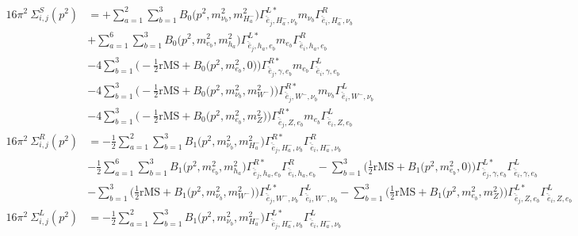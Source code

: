 \begin{itemize}
\begin{align} 
16\pi^2 \ \Sigma^S_{i,j}(p^2) &= +\sum_{a=1}^{2}\sum_{b=1}^{3}{B_0\Big(p^{2},m^2_{\nu_{{b}}},m^2_{H^-_{{a}}}\Big)} {\Gamma^{L*}_{\check{\bar{e}}_{{j}},H^-_{{a}},\nu_{{b}}}} m_{\nu_{{b}}} {\Gamma^R_{\check{\bar{e}}_{{i}},H^-_{{a}},\nu_{{b}}}} \nonumber \\ 
 &+\sum_{a=1}^{6}\sum_{b=1}^{3}{B_0\Big(p^{2},m^2_{e_{{b}}},m^2_{h_{{a}}}\Big)} {\Gamma^{L*}_{\check{\bar{e}}_{{j}},h_{{a}},e_{{b}}}} m_{e_{{b}}} {\Gamma^R_{\check{\bar{e}}_{{i}},h_{{a}},e_{{b}}}} \nonumber \\ 
 &-4 \sum_{b=1}^{3}\Big(-\frac{1}{2} \text{rMS}  + {B_0\Big(p^{2},m^2_{e_{{b}}},0\Big)}\Big){\Gamma^{R*}_{\check{\bar{e}}_{{j}},\gamma,e_{{b}}}} m_{e_{{b}}} {\Gamma^L_{\check{\bar{e}}_{{i}},\gamma,e_{{b}}}}  \nonumber \\ 
 &-4 \sum_{b=1}^{3}\Big(-\frac{1}{2} \text{rMS}  + {B_0\Big(p^{2},m^2_{\nu_{{b}}},m^2_{W^-}\Big)}\Big){\Gamma^{R*}_{\check{\bar{e}}_{{j}},W^-,\nu_{{b}}}} m_{\nu_{{b}}} {\Gamma^L_{\check{\bar{e}}_{{i}},W^-,\nu_{{b}}}}  \nonumber \\ 
 &-4 \sum_{b=1}^{3}\Big(-\frac{1}{2} \text{rMS}  + {B_0\Big(p^{2},m^2_{e_{{b}}},m^2_{Z}\Big)}\Big){\Gamma^{R*}_{\check{\bar{e}}_{{j}},Z,e_{{b}}}} m_{e_{{b}}} {\Gamma^L_{\check{\bar{e}}_{{i}},Z,e_{{b}}}}  \\ 
16\pi^2 \ \Sigma^R_{i,j}(p^2) &= -\frac{1}{2} \sum_{a=1}^{2}\sum_{b=1}^{3}{B_1\Big(p^{2},m^2_{\nu_{{b}}},m^2_{H^-_{{a}}}\Big)} {\Gamma^{R*}_{\check{\bar{e}}_{{j}},H^-_{{a}},\nu_{{b}}}} {\Gamma^R_{\check{\bar{e}}_{{i}},H^-_{{a}},\nu_{{b}}}}  \nonumber \\ 
 &-\frac{1}{2} \sum_{a=1}^{6}\sum_{b=1}^{3}{B_1\Big(p^{2},m^2_{e_{{b}}},m^2_{h_{{a}}}\Big)} {\Gamma^{R*}_{\check{\bar{e}}_{{j}},h_{{a}},e_{{b}}}} {\Gamma^R_{\check{\bar{e}}_{{i}},h_{{a}},e_{{b}}}}  - \sum_{b=1}^{3}\Big(\frac{1}{2} \text{rMS}  + {B_1\Big(p^{2},m^2_{e_{{b}}},0\Big)}\Big){\Gamma^{L*}_{\check{\bar{e}}_{{j}},\gamma,e_{{b}}}} {\Gamma^L_{\check{\bar{e}}_{{i}},\gamma,e_{{b}}}}  \nonumber \\ 
 &- \sum_{b=1}^{3}\Big(\frac{1}{2} \text{rMS}  + {B_1\Big(p^{2},m^2_{\nu_{{b}}},m^2_{W^-}\Big)}\Big){\Gamma^{L*}_{\check{\bar{e}}_{{j}},W^-,\nu_{{b}}}} {\Gamma^L_{\check{\bar{e}}_{{i}},W^-,\nu_{{b}}}}  - \sum_{b=1}^{3}\Big(\frac{1}{2} \text{rMS}  + {B_1\Big(p^{2},m^2_{e_{{b}}},m^2_{Z}\Big)}\Big){\Gamma^{L*}_{\check{\bar{e}}_{{j}},Z,e_{{b}}}} {\Gamma^L_{\check{\bar{e}}_{{i}},Z,e_{{b}}}}  \\ 
16\pi^2 \ \Sigma^L_{i,j}(p^2) &= -\frac{1}{2} \sum_{a=1}^{2}\sum_{b=1}^{3}{B_1\Big(p^{2},m^2_{\nu_{{b}}},m^2_{H^-_{{a}}}\Big)} {\Gamma^{L*}_{\check{\bar{e}}_{{j}},H^-_{{a}},\nu_{{b}}}} {\Gamma^L_{\check{\bar{e}}_{{i}},H^-_{{a}},\nu_{{b}}}}  \nonumber \\ 

\end{align}
\end{itemize}
